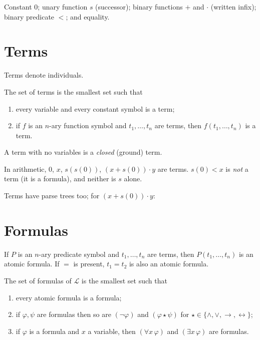 \begin{example}
Constant $0$; unary function $s$ (successor); binary functions $+$ and $\cdot$ (written
infix); binary predicate $<$; and equality.
\end{example}

\section{Terms}

Terms denote individuals.
\begin{definition}[Term]
The set of terms is the smallest set such that
\begin{enumerate}
  \item every variable and every constant symbol is a term;
  \item if $f$ is an $n$-ary function symbol and $t_1,\dots,t_n$ are terms, then
        $f(t_1,\dots,t_n)$ is a term.
\end{enumerate}
A term with no variables is a \emph{closed} (ground) term.
\end{definition}

\begin{example}
In arithmetic, $0$, $x$, $s(s(0))$, $(x+s(0))\cdot y$ are terms. $s(0)<x$ is \emph{not} a
term (it is a formula), and neither is $s$ alone.
\end{example}
Terms have parse trees too; for $(x+s(0))\cdot y$:
\begin{center}
\end{center}

\section{Formulas}

\begin{definition}
If $P$ is an $n$-ary predicate symbol and $t_1,\dots,t_n$ are terms, then
$P(t_1,\dots,t_n)$ is an atomic formula. If $=$ is present, $t_1 = t_2$ is also an atomic
formula.
\end{definition}

\begin{definition}[Formula]
The set of formulas of $\mathcal{L}$ is the smallest set such that
\begin{enumerate}
  \item every atomic formula is a formula;
  \item if $\varphi,\psi$ are formulas then so are $(\neg\varphi)$ and $(\varphi\star\psi)$
        for $\star\in\{\land,\lor,\to,\leftrightarrow\}$;
  \item if $\varphi$ is a formula and $x$ a variable, then $(\forall x\,\varphi)$ and
        $(\exists x\,\varphi)$ are formulas.
\end{enumerate}
\end{definition}

